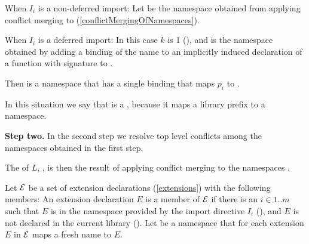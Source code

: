 \documentclass[makeidx]{article}
\begin{document}
{\LMHash{}%
When $I_i$ is a non-deferred import:
Let  be the namespace obtained from applying
conflict merging to
(\ref{conflictMergingOfNamespaces}).

\LMHash{}%
When $I_i$ is a deferred import:
In this case $k$ is 1
(),
and  is the namespace obtained by
adding a binding of the name 
to an implicitly induced declaration of a function with signature
to .

\LMHash{}%
Then  is a namespace that has
a single binding that maps $p_i$ to .

\LMHash{}%
In this situation we say that  is a
,
because it maps a library prefix to a namespace.

\EndCase

\LMHash{}%
{\bf Step two.}
In the second step we resolve top level conflicts
among the namespaces obtained in the first step.

\LMHash{}%
The  of $L$, ,
is then the result of applying conflict merging to the namespaces
.

\LMHash{}%
Let $\cal E$ be a set of extension declarations
(\ref{extensions})
with the following members:
An extension declaration $E$ is a member of $\cal E$
if there is an $i \in 1 .. m$ such that
$E$ is in the namespace provided by the import directive $I_i$
(),
and $E$ is not declared in the current library
().
Let  be a namespace that
for each extension $E$ in $\cal E$ maps a fresh name to $E$.

}
\end{document}
